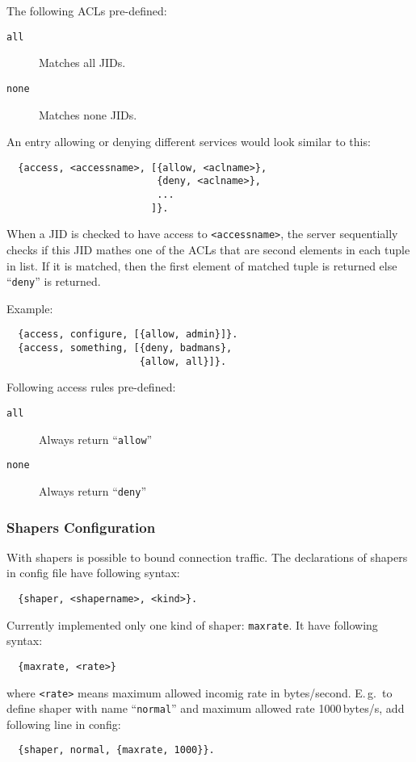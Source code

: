 \documentclass[a4paper,10pt]{article}
\newcommand{\bracehack}{\def\{{\char"7B}\def\}{\char"7D}}
\newcommand{\term}[1]{\texttt{#1}}
\newcommand{\titem}[1]{\item[\bracehack\texttt{#1}]}
\begin{document}
The following ACLs pre-defined:
\begin{description}
\titem{all} Matches all JIDs.
\titem{none} Matches none JIDs.
\end{description}

An entry allowing or denying different services would look similar to this:
\begin{verbatim}
  {access, <accessname>, [{allow, <aclname>},
                          {deny, <aclname>},
                          ...
                         ]}.
\end{verbatim}
When a JID is checked to have access to \term{<accessname>}, the server
sequentially checks if this JID mathes one of the ACLs that are second elements
in each tuple in list.  If it is matched, then the first element of matched
tuple is returned else ``\term{deny}'' is returned.

Example:
\begin{verbatim}
  {access, configure, [{allow, admin}]}.
  {access, something, [{deny, badmans},
                       {allow, all}]}.
\end{verbatim}

Following access rules pre-defined:
\begin{description}
\titem{all} Always return ``\term{allow}''
\titem{none} Always return ``\term{deny}''
\end{description}


\subsubsection{Shapers Configuration}
\label{sec:configshaper}

With shapers is possible to bound connection traffic.  The declarations of
shapers in config file have following syntax:
\begin{verbatim}
  {shaper, <shapername>, <kind>}.
\end{verbatim}
Currently implemented only one kind of shaper: \term{maxrate}.  It have
following syntax:
\begin{verbatim}
  {maxrate, <rate>}
\end{verbatim}
where \term{<rate>} means maximum allowed incomig rate in bytes/second.
E.\,g.\ to define shaper with name ``\term{normal}'' and maximum allowed rate
1000\,bytes/s, add following line in config:
\begin{verbatim}
  {shaper, normal, {maxrate, 1000}}.
\end{verbatim}
\end{document}
